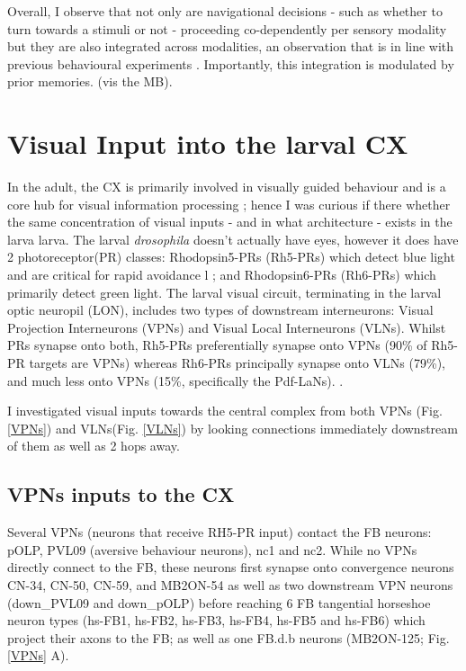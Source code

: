     Overall, I observe that not only are navigational decisions - such as whether to turn towards a stimuli or not - proceeding co-dependently per sensory modality but they are also integrated across modalities, an observation that is in line with previous behavioural experiments \citep{gepner2015computations}. Importantly, this integration is modulated by prior memories. (vis the MB). 

\section{Visual Input into the larval CX}
\label{CXvisual}  
    In the adult, the CX is primarily involved in visually guided behaviour and is a core hub for visual information processing \citep{omoto2017visual, hulse2021connectome}; hence I was curious  if there whether the same concentration of visual inputs - and in what architecture - exists in the larva larva.
    The larval \textit{drosophila} doesn't actually have eyes, however it does have 2  photoreceptor(PR) classes:  Rhodopsin5-PRs (Rh5-PRs) which detect blue light and are critical for rapid avoidance l \citep{keene2011distinct}; and Rhodopsin6-PRs (Rh6-PRs) which primarily detect green light. 
    The larval visual circuit, terminating in the larval optic neuropil (LON), includes two types of downstream interneurons:  Visual Projection Interneurons (VPNs) and Visual Local Interneurons (VLNs). Whilst PRs synapse onto both, Rh5-PRs preferentially synapse onto VPNs (90\% of Rh5-PR targets are VPNs) whereas Rh6-PRs principally synapse onto VLNs (79\%), and much less onto VPNs (15\%, specifically the Pdf-LaNs). \citep{larderet2017organization}. 

    I investigated visual inputs towards the central complex from both VPNs (Fig. \ref{VPNs}) and VLNs(Fig. \ref{VLNs}) by looking connections immediately downstream of them as well as 2 hops away.

    \subsection{VPNs inputs to the CX}
    Several VPNs (neurons that receive RH5-PR input) contact the FB neurons: pOLP, PVL09 (aversive behaviour neurons), nc1 and nc2. While no VPNs directly connect to the FB, these neurons first synapse onto convergence neurons CN-34, CN-50, CN-59,  and MB2ON-54 as well as two downstream VPN neurons (down\_PVL09 and down\_pOLP) before reaching 6 FB tangential horseshoe neuron types (hs-FB1, hs-FB2, hs-FB3, hs-FB4, hs-FB5 and hs-FB6) which project their axons to the FB; as well as one FB.d.b neurons (MB2ON-125; Fig. \ref{VPNs} A).

